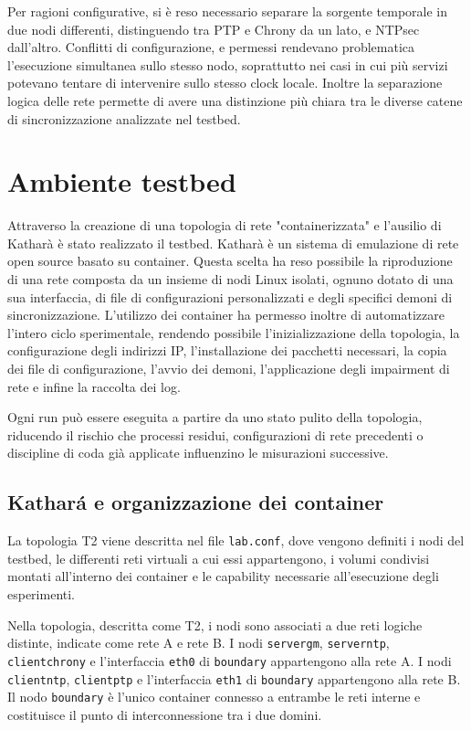 Per ragioni configurative, si è reso necessario separare la sorgente temporale
in due nodi differenti, distinguendo tra PTP e Chrony da un lato, e NTPsec dall'altro.
Conflitti di configurazione, e permessi rendevano problematica l'esecuzione
simultanea sullo stesso nodo, soprattutto nei casi in
cui più servizi potevano tentare di intervenire sullo stesso clock locale. Inoltre
la separazione logica delle rete permette di avere una distinzione più chiara tra
le diverse catene di sincronizzazione analizzate nel testbed.

\section{Ambiente testbed}

Attraverso la creazione di una topologia di rete "containerizzata" e l'ausilio di Katharà 
è stato realizzato il testbed. Katharà è un sistema di emulazione di rete open source 
basato su container. Questa scelta ha reso possibile la
riproduzione di una rete composta da un insieme di nodi Linux isolati, ognuno dotato
di una sua interfaccia, di file di configurazioni personalizzati e degli
specifici demoni di sincronizzazione. L'utilizzo dei container ha permesso inoltre
di automatizzare l'intero ciclo sperimentale, rendendo possibile l'inizializzazione
della topologia, la configurazione degli indirizzi IP, l'installazione dei
pacchetti necessari, la copia dei file di configurazione, l'avvio dei demoni, l'applicazione
degli impairment di rete e infine la raccolta dei log.

Ogni run può essere eseguita a partire da uno stato pulito della topologia,
riducendo il rischio che processi residui, configurazioni di rete precedenti o discipline
di coda già applicate influenzino le misurazioni successive.

\subsection{Kathará e organizzazione dei container}

La topologia T2 viene descritta nel file \texttt{lab.conf}, dove vengono
definiti i nodi del testbed, le differenti reti virtuali a cui essi appartengono,
i volumi condivisi montati all'interno dei container e le capability necessarie
all'esecuzione degli esperimenti.

Nella topologia, descritta come T2, i nodi sono associati a due reti logiche
distinte, indicate come rete A e rete B. I nodi \texttt{servergm}, \texttt{serverntp},
\texttt{clientchrony} e l'interfaccia \texttt{eth0} di \texttt{boundary} appartengono
alla rete A. I nodi \texttt{clientntp}, \texttt{clientptp} e l'interfaccia \texttt{eth1}
di \texttt{boundary} appartengono alla rete B. Il nodo \texttt{boundary} è l'unico
container connesso a entrambe le reti interne e costituisce il punto di interconnessione
tra i due domini.

